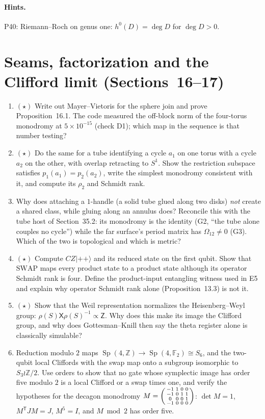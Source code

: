 \documentclass[11pt]{article}
\newcommand{\Z}{\mathbb{Z}}
\newcommand{\Sp}{\operatorname{Sp}}
\begin{document}
\paragraph{Hints.} P40: Riemann--Roch on genus one: $h^0(D) = \deg D$ for $\deg D>0$.

\section{Seams, factorization and the Clifford limit (Sections~16--17)}

\begin{enumerate}[label=\textbf{P\arabic*.},leftmargin=*,start=42]
\item $(\star)$ Write out Mayer--Vietoris for the sphere join and prove
  Proposition~16.1. The code measured the off-block norm of the
  four-torus monodromy at $5\times10^{-15}$ (check D1); which map in the
  sequence is that number testing?
\item $(\star)$ Do the same for a tube identifying a cycle $a_1$ on one torus
  with a cycle $a_2$ on the other, with overlap retracting to $S^1$. Show the restriction subspace satisfies
  $p_1(a_1) = p_2(a_2)$, write the simplest monodromy consistent with it,
  and compute its $\rho_2$ and Schmidt rank.
\item Why does attaching a $1$-handle (a solid tube glued along two disks)
  \emph{not} create a shared class, while gluing along an annulus does?
  Reconcile this with the tube host of Section~35.2: its monodromy is the
  identity (G2, ``the tube alone couples no cycle'') while the far surface's
  period matrix has $\Omega_{12}\ne0$ (G3). Which of the two is topological
  and which is metric?
\item $(\star)$ Compute $CZ|{+}{+}\rangle$ and its reduced state on the first qubit.
  Show that $\mathrm{SWAP}$ maps every product state to a product state
  although its operator Schmidt rank is four. Define the product-input
  entangling witness used in E5 and explain why operator Schmidt rank alone
  (Proposition~13.3) is not it.
\item $(\star)$ Show that the Weil representation normalizes the
  Heisenberg--Weyl group: $\rho(S)\mathsf X\rho(S)^{-1}\propto\mathsf Z$. Why
  does this make its image the Clifford group, and why does Gottesman--Knill
  then say the theta register alone is classically simulable?
\item Reduction modulo $2$ maps $\Sp(4,\Z)\to\Sp(4,\mathbb F_2)\cong S_6$, and the
  two-qubit local Cliffords with the swap map onto a subgroup isomorphic to
  $S_3\wr\Z/2$. Use orders to show that no gate whose symplectic image has
  order five modulo $2$ is a local Clifford or a swap times one, and verify
  the hypotheses for the decagon monodromy
  $M = \begin{psmallmatrix}-1&1&0&0\\-1&0&1&1\\0&0&0&1\\-1&0&0&0\end{psmallmatrix}$:
  $\det M = 1$, $M^{\mathsf T}JM = J$, $M^5 = I$, and $M\bmod2$ has order five.
\end{enumerate}
\end{document}
